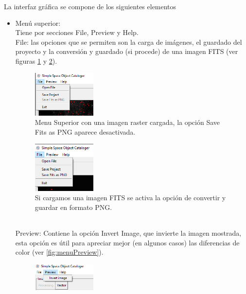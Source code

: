	La interfaz gráfica se compone de los siguientes elementos
	\begin{itemize}
		\item Menú superior:
		\newline
		\\Tiene por secciones File, Preview y Help.
			\\File: las opciones que se permiten son la carga de imágenes, el guardado del proyecto y la conversión y guardado (si procede) de una imagen FITS (ver figuras  \ref{fig:menuFile} y \ref{fig:menuFileActive}).
			\begin{figure}[!htb]
				\centering
				\includegraphics[width=0.3\textwidth]{images/gui/menuFileGhost.jpg}
				\caption{\label{fig:menuFile}{\small Menu Superior con una imagen raster cargada, la opción Save Fits as PNG aparece desactivada.}}
			\end{figure}
			\begin{figure}[!htb]
				\centering
				\includegraphics[width=0.3\textwidth]{images/gui/menuFileUnGhost.jpg}
				\caption{\label{fig:menuFileActive}{\small Si cargamos una imagen FITS se activa la opción de convertir y guardar en formato PNG.}}
			\end{figure}
			\newline
			\\Preview: Contiene la opción Invert Image, que invierte la imagen mostrada, esta opción es útil para apreciar mejor (en algunos casos) las diferencias de color (ver \ref{fig:menuPreview}).
			\begin{figure}[!htb]
				\centering
				\includegraphics[width=0.3\textwidth]{images/gui/menuPreview.jpg}

\end{figure}
\end{itemize}
